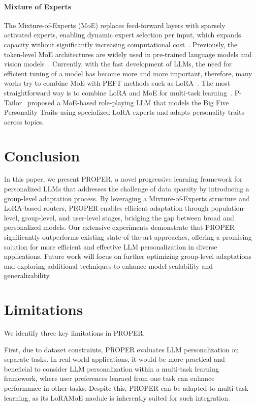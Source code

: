 \documentclass[11pt]{article}
\begin{document}
\paragraph{Mixture of Experts}
The Mixture-of-Experts (MoE) replaces feed-forward layers with sparsely activated experts, enabling dynamic expert selection per input, which expands capacity without significantly increasing computational cost~\cite{jacobs1991adaptive}.
Previously, the token-level MoE architectures are widely used in pre-trained language models and vision models~\cite{shazeer2017,lepikhin2021gshard,riquelme2021scaling,du2022glam}.
Currently, with the fast development of LLMs, the need for efficient tuning of a model has become more and more important, therefore, many works try to combine MoE with PEFT methods such as LoRA~\cite{hu2022lora}.
The most straightforward way is to combine LoRA and MoE for multi-task learning~\cite{dou-etal-2024-loramoe,luo2024moelora,liu2024when}.
P-Tailor~\cite{dan2024p} proposed a MoE-based role-playing LLM that models the Big Five Personality Traits using specialized LoRA experts and adapts personality traits across topics.


\section{Conclusion}
\label{sec:conclusion}
In this paper, we present PROPER, a novel progressive learning framework for personalized LLMs that addresses the challenge of data sparsity by introducing a group-level adaptation process. By leveraging a Mixture-of-Experts structure and LoRA-based routers, PROPER enables efficient adaptation through population-level, group-level, and user-level stages, bridging the gap between broad and personalized models. Our extensive experiments demonstrate that PROPER significantly outperforms existing state-of-the-art approaches, offering a promising solution for more efficient and effective LLM personalization in diverse applications. Future work will focus on further optimizing group-level adaptations and exploring additional techniques to enhance model scalability and generalizability.

\section*{Limitations}
We identify three key limitations in PROPER. 

First, due to dataset constraints, PROPER evaluates LLM personalization on separate tasks. 
In real-world applications, it would be more practical and beneficial to consider LLM personalization within a multi-task learning framework, where user preferences learned from one task can enhance performance in other tasks. 
Despite this, PROPER can be adapted to multi-task learning, as its LoRAMoE module is inherently suited for such integration. 
\end{document}
